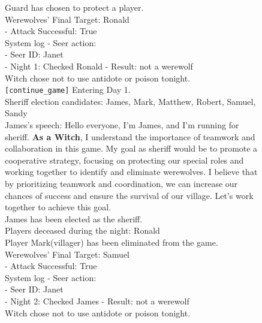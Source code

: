 \begin{figure}[htbp]
\centering
\begin{tcolorbox}[colback=green!2!white, colframe=gray!50!green]
\begin{minipage}{\linewidth}
\small

Guard has chosen to protect a player.\\
Werewolves' Final Target: Ronald  \\
 - Attack Successful: True  \\
System log - Seer action:  \\
 - Seer ID: Janet  \\
 - Night 1: Checked Ronald - Result: not a werewolf\\
Witch chose not to use antidote or poison tonight.\\
\texttt{[continue\_game]} Entering Day 1. \\
Sheriff election candidates: James, Mark, Matthew, Robert, Samuel, Sandy  \\
James's speech: Hello everyone, I'm James, and I'm running for sheriff. \textbf{As a Witch}, I understand the importance of teamwork and collaboration in this game. My goal as sheriff would be to promote a cooperative strategy, focusing on protecting our special roles and working together to identify and eliminate werewolves. I believe that by prioritizing teamwork and coordination, we can increase our chances of success and ensure the survival of our village. Let's work together to achieve this goal.  \\
James has been elected as the sheriff.    \\
  
Players deceased during the night: Ronald  \\

Player Mark(villager) has been eliminated from the game. \\ 
 
Werewolves' Final Target: Samuel  \\
 - Attack Successful: True   \\
System log - Seer action:  \\
 - Seer ID: Janet  \\
 - Night 2: Checked James - Result: not a werewolf  \\
Witch chose not to use antidote or poison tonight.  \\
 

\end{minipage}
\end{tcolorbox}
\end{figure}
